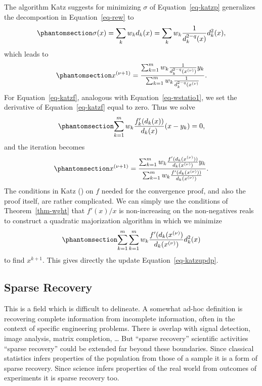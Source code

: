 \documentclass[
  12pt,
  letterpaper,
  DIV=11,
  numbers=noendperiod]{scrartcl}
\theoremstyle{definition}
\theoremstyle{definition}
\theoremstyle{plain}
\theoremstyle{plain}
\theoremstyle{plain}
\theoremstyle{remark}
\begin{document}
The algorithm Katz suggests for minimizing \(\sigma\) of
Equation~\ref{eq-katzp} generalizes the decompostion in
Equation~\ref{eq-rew} to
\begin{equation}\phantomsection\label{eq-katzdec}{
\sigma(x)=\sum_k w_kd_k(x)=\sum_kw_k \frac{1}{d_k^{2-q}(x)}d_k^2(x),
}\end{equation} which leads to
\begin{equation}\phantomsection\label{eq-katzupdp}{
x^{(\nu+1)}=\frac{\sum_{k=1}^mw_k\frac{1}{d_k^{2-q}(x^{(\nu)})}y_k}{\sum_{k=1}^mw_k\frac{1}{d_k^{2-q}(x^{(\nu)}}}.
}\end{equation} For Equation~\ref{eq-katzf}, analogous with
Equation~\ref{eq-wstatio1}, we set the derivative of
Equation~\ref{eq-katzf} equal to zero. Thus we solve
\begin{equation}\phantomsection\label{eq-katzder}{
\sum_{k=1}^mw_k\frac{f_k'(d_k(x))}{d_k(x)}(x-y_k)=0,
}\end{equation} and the iteration becomes
\begin{equation}\phantomsection\label{eq-katzupdf}{
x^{(\nu+1)}=\frac{\sum_{k=1}^mw_k\frac{f'(d_k(x^{(\nu)}))}{d_k(x^{(\nu)})}y_k}{\sum_{k=1}^mw_k\frac{f'(d_k(x^{(\nu)}))}{d_k(x^{(\nu)})}}.
}\end{equation} The conditions in Katz () on
\(f\) needed for the convergence proof, and also the proof itself, are
rather complicated. We can simply use the conditions of
Theorem~\ref{thm-wght} that \(f'(x)/x\) is non-increasing on the
non-negatives reals to construct a quadratic majorization algorithm in
which we minimize \begin{equation}\phantomsection\label{eq-katzmajor}{
\sum_{k=1}^m\sum_{k=1}^mw_k\frac{f'(d_k(x^{(\nu)})}{d_k(x^{(\nu)})}d_k^2(x)
}\end{equation} to find \(x^{k+1}\). This gives directly the update
Equation~\ref{eq-katzupdp}.

\subsection{Sparse Recovery}\label{sparse-recovery}

This is a field which is difficult to delineate. A somewhat ad-hoc
definition is recovering complete information from incomplete
information, often in the context of specific engineering problems.
There is overlap with signal detection, image analysis, matrix
completion, \ldots{} But ``sparse recovery'' scientific activities
``sparse recovery'' could be extended far beyond these boundaries. Since
classical statistics infers properties of the population from those of a
sample it is a form of sparse recovery. Since science infers properties
of the real world from outcomes of experiments it is sparse recovery
too.
\end{document}
